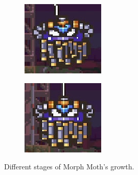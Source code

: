 \begin{figure}[htp]
\begin{subfigure}{0.3\linewidth}
	\end{subfigure}
	\begin{subfigure}{0.3\linewidth}
		\centering
		\includegraphics[width=\linewidth]{figures/X2/Morph_moth/Moth_5.jpg}	
	\end{subfigure}
	\begin{subfigure}{0.3\linewidth}
		\centering
		\includegraphics[width=\linewidth]{figures/X2/Morph_moth/Moth_6.jpg}
	\end{subfigure}
	\caption{Different stages of Morph Moth's growth.}
\end{figure}
